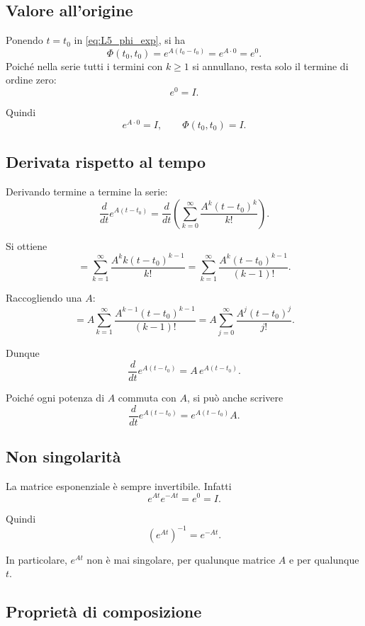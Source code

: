 \subsection{Valore all'origine}

Ponendo $t=t_0$ in \eqref{eq:L5_phi_exp}, si ha
\[
\Phi(t_0,t_0)=e^{A(t_0-t_0)}=e^{A\cdot 0}=e^{0}.
\]
Poiché nella serie tutti i termini con $k\ge 1$ si annullano, resta solo il termine di ordine zero:
\[
e^{0}=I.
\]

Quindi
\begin{equation}
e^{A\cdot 0}=I,
\qquad
\Phi(t_0,t_0)=I.
\label{eq:L5_exp_identity}
\end{equation}

\subsection{Derivata rispetto al tempo}

Derivando termine a termine la serie:
\[
\frac{d}{dt}e^{A(t-t_0)}
=
\frac{d}{dt}\left(
\sum_{k=0}^{\infty}\frac{A^k (t-t_0)^k}{k!}
\right).
\]

Si ottiene
\[
=
\sum_{k=1}^{\infty}\frac{A^k k (t-t_0)^{k-1}}{k!}
=
\sum_{k=1}^{\infty}\frac{A^k (t-t_0)^{k-1}}{(k-1)!}.
\]

Raccogliendo una $A$:
\[
=
A\sum_{k=1}^{\infty}\frac{A^{k-1}(t-t_0)^{k-1}}{(k-1)!}
=
A\sum_{j=0}^{\infty}\frac{A^j (t-t_0)^j}{j!}.
\]

Dunque
\begin{equation}
\frac{d}{dt}e^{A(t-t_0)}=A\,e^{A(t-t_0)}.
\label{eq:L5_exp_derivative}
\end{equation}

Poiché ogni potenza di $A$ commuta con $A$, si può anche scrivere
\[
\frac{d}{dt}e^{A(t-t_0)}=e^{A(t-t_0)}A.
\]

\subsection{Non singolarità}

La matrice esponenziale è sempre invertibile. Infatti
\[
e^{At}e^{-At}=e^{0}=I.
\]

Quindi
\begin{equation}
\left(e^{At}\right)^{-1}=e^{-At}.
\label{eq:L5_exp_inverse}
\end{equation}

In particolare, $e^{At}$ non è mai singolare, per qualunque matrice $A$ e per qualunque $t$.

\subsection{Proprietà di composizione}

